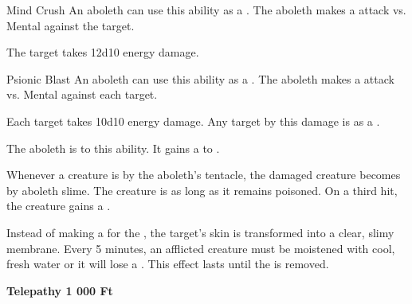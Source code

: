     \begin{freeability}{Mind Crush}
      An aboleth can use this ability as a . The aboleth makes a  attack
        vs. Mental against the target.
    
    \hit The target takes 12d10 energy damage.
    \end{freeability}
  

    \begin{freeability}{Psionic Blast}
      An aboleth can use this ability as a . The aboleth makes a  attack
        vs. Mental against each target.
    
    \hit Each target takes 10d10 energy damage. Any target  by this damage is  as a .
    \end{freeability}
  
        The aboleth is  to this ability.
        It gains a   to .
      
        Whenever a creature is  by the aboleth's tentacle,
          the damaged creature becomes  by aboleth slime.
        The creature is  as long as it remains poisoned.
        On a third hit, the creature gains a .

        Instead of making a  for the ,
          the target's skin is transformed into a clear, slimy membrane.
        Every 5 minutes, an afflicted creature must be moistened with cool, fresh water
          or it will lose a .
        This effect lasts until the  is removed.
      
    \par \textbf{Telepathy 1 000 Ft}
  
